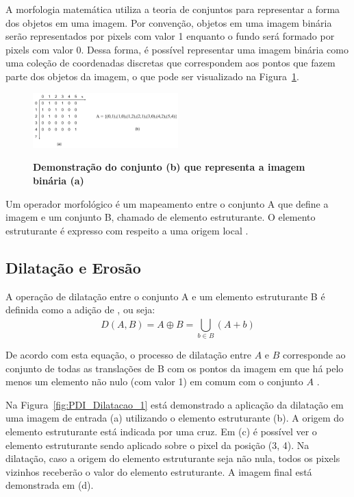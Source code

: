\documentclass[12pt,oneside,a4paper,english,french,spanish,brazil,]{abntex2}
\begin{document}
A morfologia matemática utiliza a teoria de conjuntos para representar a forma dos objetos em uma imagem. Por convenção, objetos em uma imagem binária serão representados por pixels com valor 1 enquanto o fundo será formado por pixels com valor 0. Dessa forma, é possível representar uma imagem binária como uma coleção de coordenadas discretas que correspondem aos pontos que fazem parte dos objetos da imagem, o que pode ser visualizado na Figura~\ref{fig:PDI_Conjunto}.

\begin{figure}[ht]
\centering
\caption{\textbf{Demonstração do conjunto (b) que representa a imagem binária (a)}}
\includegraphics[width=0.5\textwidth]{imagens/PDI_Conjunto.pdf}
\label{fig:PDI_Conjunto}
\end{figure}

Um operador morfológico é um mapeamento entre o conjunto A que define a imagem e um conjunto B, chamado de elemento estruturante. O elemento estruturante é expresso com respeito a uma origem local \cite{pedrini:2008}.

\subsection{Dilatação e Erosão}

A operação de dilatação entre o conjunto A e um elemento estruturante B é definida como a adição de \citet{minkowski:1911}, ou seja: \[D(A,B)=A\oplus B=\bigcup_{b\in B}^{ } (A+b)\]

De acordo com esta equação, o processo de dilatação entre \(A\) e \(B\) corresponde ao conjunto de todas as translações de B com os pontos da imagem em que há pelo menos um elemento não nulo (com valor 1) em comum com o conjunto \(A\) \cite{pedrini:2008}. 

Na Figura~\ref{fig:PDI_Dilatacao_1} está demonstrado a aplicação da dilatação em uma imagem de entrada (a) utilizando o elemento estruturante (b). A origem do elemento estruturante está indicada por uma cruz. Em (c) é possível ver o elemento estruturante sendo aplicado sobre o pixel da posição (3, 4). Na dilatação, caso a origem do elemento estruturante seja não nula, todos os pixels vizinhos receberão o valor do elemento estruturante. A imagem final está demonstrada em (d).
\end{document}

